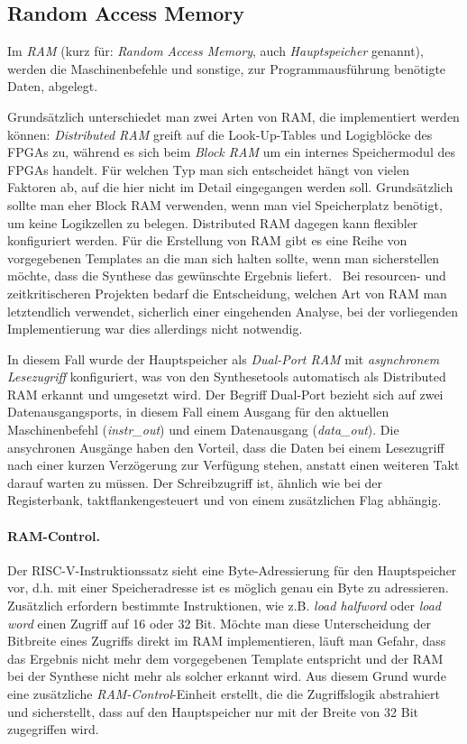 \subsection{Random Access Memory}

Im \textit{RAM} (kurz für: \textit{Random Access Memory}, auch \textit{Hauptspeicher} genannt), werden die Maschinenbefehle und sonstige, zur Programmausführung benötigte Daten, abgelegt.

Grundsätzlich unterschiedet man zwei Arten von RAM, die implementiert werden können:
\textit{Distributed RAM} greift auf die Look-Up-Tables und Logigblöcke des FPGAs zu, während es sich beim \textit{Block RAM} um ein internes Speichermodul des FPGAs handelt.
Für welchen Typ man sich entscheidet hängt von vielen Faktoren ab, auf die hier nicht im Detail eingegangen werden soll. 
Grundsätzlich sollte man eher Block RAM verwenden, wenn man viel Speicherplatz benötigt, um keine Logikzellen zu belegen.
Distributed RAM dagegen kann flexibler konfiguriert werden. 
Für die Erstellung von RAM gibt es eine Reihe von vorgegebenen Templates an die man sich halten sollte, wenn man sicherstellen möchte, dass die Synthese das gewünschte Ergebnis liefert.~\cite[S. 243 ff.]{Chu}
Bei resourcen- und zeitkritischeren Projekten bedarf die Entscheidung, welchen Art von RAM man letztendlich verwendet, sicherlich einer eingehenden Analyse, bei der vorliegenden Implementierung war dies allerdings nicht notwendig.

In diesem Fall wurde der Hauptspeicher als \textit{Dual-Port RAM} mit \textit{asynchronem Lesezugriff} konfiguriert, was von den Synthesetools automatisch als Distributed RAM erkannt und umgesetzt wird.
Der Begriff Dual-Port bezieht sich auf zwei Datenausgangsports, in diesem Fall einem Ausgang für den aktuellen Maschinenbefehl (\textit{instr\_out}) und einem Datenausgang (\textit{data\_out}).
Die ansychronen Ausgänge haben den Vorteil, dass die Daten bei einem Lesezugriff nach einer kurzen Verzögerung zur Verfügung stehen, anstatt einen weiteren Takt darauf warten zu müssen.
Der Schreibzugriff ist, ähnlich wie bei der Registerbank, taktflankengesteuert und von einem zusätzlichen Flag abhängig.

\paragraph{RAM-Control.} Der RISC-V-Instruktionssatz sieht eine Byte-Adressierung für den Hauptspeicher vor, d.h. mit einer Speicheradresse ist es möglich genau ein Byte zu adressieren.
Zusätzlich erfordern bestimmte Instruktionen, wie z.B. \textit{load halfword} oder \textit{load word} einen Zugriff auf 16 oder 32 Bit.
Möchte man diese Unterscheidung der Bitbreite eines Zugriffs direkt im RAM implementieren, läuft man Gefahr, dass das Ergebnis nicht mehr dem vorgegebenen Template entspricht und der RAM bei der Synthese nicht mehr als solcher erkannt wird.
Aus diesem Grund wurde eine zusätzliche \textit{RAM-Control}-Einheit erstellt, die die Zugriffslogik abstrahiert und sicherstellt, dass auf den Hauptspeicher nur mit der Breite von 32 Bit zugegriffen wird.

